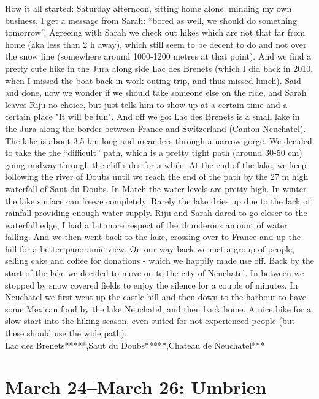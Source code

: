 How it all started: Saturday afternoon, sitting home alone, minding my own business, I get a message from Sarah: ``bored as well, we should do something tomorrow''. Agreeing with Sarah we check out hikes which are not that far from home (aka less than 2 h away), which still seem to be decent to do and not over the snow line (somewhere around 1000-1200 metres at that point). And we find a pretty cute hike in the Jura along side Lac des Brenets (which I did back in 2010, when I missed the boat back in work outing trip, and thus missed lunch). Said and done, now we wonder if we should take someone else on the ride, and Sarah leaves Riju no choice, but just tells him to show up at a certain time and a certain place "It will be fun". And off we go: Lac des Brenets is a small lake in the Jura along the border between France and Switzerland (Canton Neuchatel). The lake is about 3.5 km long and meanders through a narrow gorge. We decided to take the the ``difficult'' path, which is a pretty tight path (around 30-50 cm) going midway through the cliff sides for a while. At the end of the lake, we keep following the river of Doubs until we reach the end of the path by the 27 m high waterfall of Saut du Doubs. In March the water levels are pretty high. In winter the lake surface can freeze completely. Rarely the lake dries up due to the lack of rainfall providing enough water supply. Riju and Sarah dared to go closer to the waterfall edge, I had a bit more respect of the thunderous amount of water falling. And we then went back to the lake, crossing over to France and up the hill for a better panoramic view. On our way back we met a group of people, selling cake and coffee for donations - which we happily made use off. Back by the start of the lake we decided to move on to the city of Neuchatel. In between we stopped by snow covered fields to enjoy the silence for a couple of minutes. In Neuchatel we first went up the castle hill and then down to the harbour to have some Mexican food by the lake Neuchatel, and then back home. A nice hike for a slow start into the hiking season, even suited for not experienced people (but these should use the wide path).\\

Lac des Brenets*****,Saut du Doubs*****,Chateau de Neuchatel***\\

\section{March 24--March 26: Umbrien}
\label{2017:Umbria}

